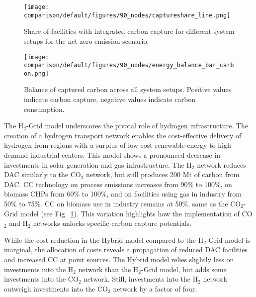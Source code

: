 \documentclass[twocolumn]{article}
\newcommand{\carbon}{CO$_2$}
\newcommand{\hydrogen}{H$_2$}
\newcommand{\modCO}{CO$_2$-Grid model}
\newcommand{\modH}{H$_2$-Grid model}
\begin{document}
\begin{figure}[h]
    \centering
    \texttt{[image: comparison/default/figures/90\_nodes/captureshare\_line.png]}
    \caption{Share of facilities with integrated carbon capture for different system setups for the net-zero emission scenario.}
    \label{fig:captureshare_line}
\end{figure}%

\begin{figure}[ht!]
    \centering
    \texttt{[image: comparison/default/figures/90\_nodes/energy\_balance\_bar\_carbon.png]}
    \caption{Balance of captured carbon across all system setups. Positive values indicate carbon capture, negative values indicate carbon consumption.}
    \label{fig:balance_captured_carbon}
\end{figure}


The \hydrogen{}-Grid model underscores the pivotal role of hydrogen infrastructure. The creation of a hydrogen transport network enables the cost-effective delivery of hydrogen from regions with a surplus of low-cost renewable energy to high-demand industrial centers. This model shows a pronounced decrease in investments in solar generation and gas infrastructure. The \hydrogen{} network reduces DAC similarly to the \carbon{} network, but still produces 200 Mt of carbon from DAC. CC technology on process emissions increases from 90\% to 100\%, on biomass CHPs from 60\% to 100\%, and on facilities using gas in industry from 50\% to 75\%. CC on biomass use in industry remains at 50\%, same as the \modCO{} (see Fig.~\ref{fig:captureshare_line}). This variation highlights how the implementation of \carbon{} and \hydrogen{} networks unlocks specific carbon capture potentials.

While the cost reduction in the Hybrid model compared to the \hydrogen-Grid model is marginal, the allocation of costs reveals a propagation of reduced DAC facilities and increased CC at point sources. The Hybrid model relies slightly less on investments into the \hydrogen{} network than the \modH, but adds some investments into the \carbon{} network. Still, investments into the \hydrogen{} network outweigh investments into the \carbon{} network by a factor of four.
\end{document}
